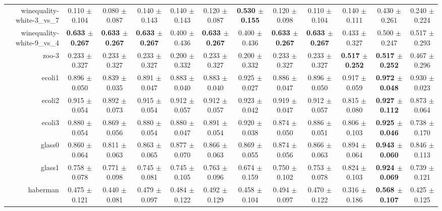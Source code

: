 \begin{table}[!ht]
{\begin{tabular}{r c c c c c c c c c c c}
winequality-white-3\_vs\_7 & 0.110 $\pm$ 0.104 & 0.080 $\pm$ 0.087 & 0.140 $\pm$ 0.143 & 0.140 $\pm$ 0.143 & 0.120 $\pm$ 0.087 & \textbf{0.530 $\pm$ 0.155} & 0.120 $\pm$ 0.098 & 0.110 $\pm$ 0.104 & 0.140 $\pm$ 0.111 & 0.430 $\pm$ 0.261 & 0.240 $\pm$ 0.224 \\
winequality-white-9\_vs\_4 & \textbf{0.633 $\pm$ 0.267} & \textbf{0.633 $\pm$ 0.267} & \textbf{0.633 $\pm$ 0.267} & 0.400 $\pm$ 0.436 & \textbf{0.633 $\pm$ 0.267} & 0.400 $\pm$ 0.436 & \textbf{0.633 $\pm$ 0.267} & \textbf{0.633 $\pm$ 0.267} & 0.433 $\pm$ 0.327 & 0.500 $\pm$ 0.247 & 0.517 $\pm$ 0.293 \\
zoo-3 & 0.233 $\pm$ 0.327 & 0.233 $\pm$ 0.327 & 0.233 $\pm$ 0.327 & 0.200 $\pm$ 0.332 & 0.233 $\pm$ 0.327 & 0.200 $\pm$ 0.332 & 0.233 $\pm$ 0.327 & 0.233 $\pm$ 0.327 & \textbf{0.517 $\pm$ 0.252} & \textbf{0.517 $\pm$ 0.252} & 0.467 $\pm$ 0.296 \\
ecoli1 & 0.896 $\pm$ 0.050 & 0.839 $\pm$ 0.035 & 0.891 $\pm$ 0.047 & 0.883 $\pm$ 0.040 & 0.883 $\pm$ 0.040 & 0.925 $\pm$ 0.027 & 0.886 $\pm$ 0.047 & 0.896 $\pm$ 0.050 & 0.917 $\pm$ 0.059 & \textbf{0.972 $\pm$ 0.048} & 0.930 $\pm$ 0.023 \\
ecoli2 & 0.915 $\pm$ 0.054 & 0.892 $\pm$ 0.073 & 0.915 $\pm$ 0.054 & 0.912 $\pm$ 0.057 & 0.912 $\pm$ 0.057 & 0.923 $\pm$ 0.042 & 0.919 $\pm$ 0.047 & 0.912 $\pm$ 0.057 & 0.815 $\pm$ 0.080 & \textbf{0.927 $\pm$ 0.112} & 0.873 $\pm$ 0.064 \\
ecoli3 & 0.880 $\pm$ 0.054 & 0.869 $\pm$ 0.056 & 0.880 $\pm$ 0.054 & 0.880 $\pm$ 0.047 & 0.891 $\pm$ 0.054 & 0.920 $\pm$ 0.038 & 0.874 $\pm$ 0.050 & 0.886 $\pm$ 0.051 & 0.806 $\pm$ 0.103 & \textbf{0.925 $\pm$ 0.046} & 0.738 $\pm$ 0.170 \\
glass0 & 0.860 $\pm$ 0.064 & 0.811 $\pm$ 0.063 & 0.863 $\pm$ 0.065 & 0.877 $\pm$ 0.070 & 0.866 $\pm$ 0.063 & 0.869 $\pm$ 0.055 & 0.874 $\pm$ 0.056 & 0.866 $\pm$ 0.063 & 0.894 $\pm$ 0.064 & \textbf{0.943 $\pm$ 0.060} & 0.846 $\pm$ 0.113 \\
glass1 & 0.758 $\pm$ 0.078 & 0.771 $\pm$ 0.098 & 0.745 $\pm$ 0.081 & 0.745 $\pm$ 0.105 & 0.763 $\pm$ 0.096 & 0.674 $\pm$ 0.159 & 0.750 $\pm$ 0.102 & 0.753 $\pm$ 0.078 & 0.824 $\pm$ 0.103 & \textbf{0.924 $\pm$ 0.069} & 0.739 $\pm$ 0.121 \\
haberman & 0.475 $\pm$ 0.121 & 0.440 $\pm$ 0.081 & 0.479 $\pm$ 0.097 & 0.484 $\pm$ 0.122 & 0.492 $\pm$ 0.129 & 0.458 $\pm$ 0.104 & 0.494 $\pm$ 0.097 & 0.470 $\pm$ 0.122 & 0.316 $\pm$ 0.186 & \textbf{0.568 $\pm$ 0.107} & 0.425 $\pm$ 0.125 \\

\end{tabular}}
\end{table}
